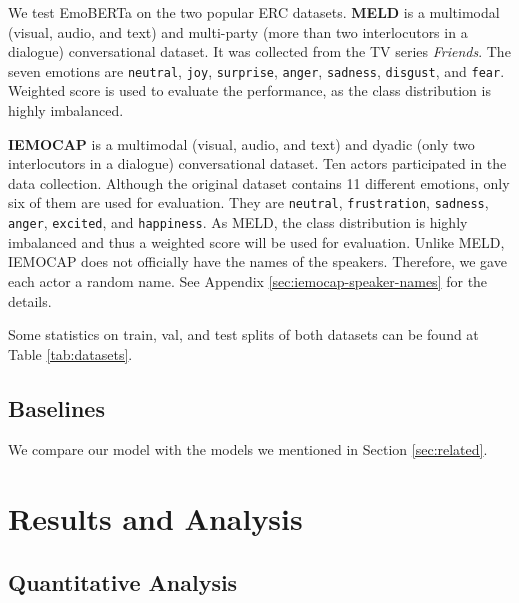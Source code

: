 \documentclass[11pt]{article}
\begin{document}

We test EmoBERTa on the two popular ERC datasets.                              
\textbf{MELD} \citep{poria-etal-2019-meld} is a multimodal (visual, audio, and text) and multi-party (more than two interlocutors in a dialogue) conversational dataset. It was collected from the TV series \textit{Friends}. The seven emotions are \texttt{neutral}, \texttt{joy}, \texttt{surprise}, \texttt{anger}, \texttt{sadness}, \texttt{disgust}, and \texttt{fear}. Weighted  score is used to evaluate the performance, as the class distribution is highly imbalanced. 
                                             
\textbf{IEMOCAP} \cite{Busso2008IEMOCAPIE} is a multimodal (visual, audio, and text) and dyadic (only two interlocutors in a dialogue) conversational dataset. Ten actors participated in the data collection. Although the original dataset contains 11 different emotions, only six of them are used for evaluation. They are \texttt{neutral}, \texttt{frustration}, \texttt{sadness}, \texttt{anger}, \texttt{excited}, and \texttt{happiness}. As MELD, the class distribution is highly imbalanced and thus a weighted  score will be used for evaluation. Unlike MELD, IEMOCAP does not officially have the names of the speakers. Therefore, we gave each actor a random name. See Appendix \ref{sec:iemocap-speaker-names} for the details.

Some statistics on train, val, and test splits of both datasets can be found at Table \ref{tab:datasets}.

\subsection{Baselines}

We compare our model with the models we mentioned in Section \ref{sec:related}.

\section{Results and Analysis}
\label{sec:results}

\subsection{Quantitative Analysis}
\end{document}
